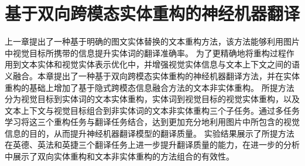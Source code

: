 \chapter{基于双向跨模态实体重构的神经机器翻译}

上一章提出了一种基于明确的图文实体替换的文本重构方法，该方法能够利用图片中视觉目标所携带的信息提升实体词的翻译准确率。
为了更精确地将重构过程作用到文本实体和视觉实体表示优化中，并增强视觉实体信息与文本上下文之间的语义融合。本章提出了一种基于双向跨模态实体重构的神经机器翻译方法，并在实体重构的基础上增加了基于隐式跨模态信息融合方法的文本非实体重构。
所提方法分为视觉目标到实体词的文本实体重构，实体词到视觉目标的视觉实体重构，以及文本上下文与视觉目标组合到非实体词的文本非实体重构三个子任务。通过多任务学习将这三个重构任务与翻译任务结合，达到更加充分地利用图片中所包含的视觉信息的目的，从而提升神经机器翻译模型的翻译质量。
实验结果展示了所提方法在英德、英法和英捷三个翻译任务上进一步提升翻译质量的能力，在进一步的分析中展示了双向实体重构和文本非实体重构的方法组合的有效性。








